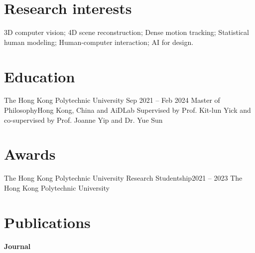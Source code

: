 \documentclass[letterpaper,11pt]{article}
\begin{document}
    \maketitle

    \section{Research interests}

    \begin{resumeItemize}
        \item 3D computer vision; 4D scene reconstruction; Dense motion tracking; Statistical human modeling; Human-computer interaction; AI for design.
    \end{resumeItemize}
    
    \section{Education}

    \resumeColumnsStart
        \resumeEntry
            {The Hong Kong Polytechnic University
            }{Sep 2021 -- Feb 2024}
            {Master of Philosophy}{Hong Kong, China}
        \resumeSubline
            {and AiDLab}{}
        \resumeSubline
            {Supervised by Prof. Kit-lun Yick and co-supervised by Prof. Joanne Yip and Dr. Yue Sun}
    \resumeColumnsEnd

    \section{Awards}

    \resumeColumnsStart
        \resumeEntry
            {The Hong Kong Polytechnic University Research Studentship}{2021 -- 2023}
            {The Hong Kong Polytechnic University}{}
    \resumeColumnsEnd

    \section{Publications}

    

    \begin{resumeItemize}
        
        
        \item \textbf{Journal}
        \item {} 
        \item {} 
     \end{resumeItemize}
\end{document}
